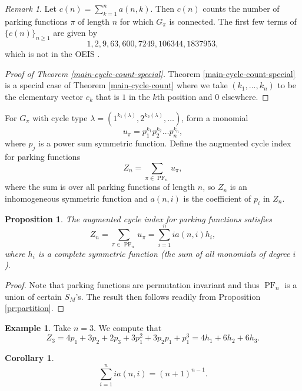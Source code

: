 \documentclass[letterpaper]{amsart}
\theoremstyle{plain}
\newtheorem{proposition}[theorem]{Proposition}
\newtheorem{corollary}[theorem]{Corollary}
\theoremstyle{definition}
\newtheorem{example}[theorem]{Example}
\theoremstyle{remark}
\newtheorem*{remark}{Remark}
\DeclareMathOperator{\PF}{PF}
\begin{document}
\begin{remark}\label{rk:parking}
Let $c(n)=\sum_{k=1}^n a(n, k)$. Then $c(n)$ counts the number of parking functions $\pi$ of length $n$ for which $G_\pi$ is connected. The first few terms of $\{c(n)\}_{n \geq 1}$ are given by
\[1, 2, 9, 63, 600, 7249, 106344, 1837953,\]
which is not in the OEIS \cite{OEIS}.
\end{remark}

\begin{proof}[Proof of Theorem \ref{main-cycle-count-special}]
Theorem \ref{main-cycle-count-special} is a special case of Theorem \ref{main-cycle-count} where we take $(k_1, \dots, k_n)$ to be the elementary vector $e_k$ that is $1$ in the $k$th position and $0$ elsewhere.
\end{proof}

For $G_\pi$ with cycle type $\lambda=(1^{k_1(\lambda)}, 2^{k_2(\lambda)}, \dots)$, form a monomial \[u_\pi=p_1^{k_1} p_2^{k_2} \dots p_n^{k_n},\]
where $p_j$ is a power sum symmetric function. Define the augmented cycle index for parking functions
\begin{equation*}
Z_n=\sum_{\pi \in \PF_n} u_\pi,
\end{equation*}
where the sum is over all parking functions of length $n$, so $Z_n$ is an inhomogeneous symmetric function and $a(n,i)$ is the coefficient of $p_i$ in $Z_n$.

\begin{proposition}\label{pr:parking-augmented}
The augmented cycle index for parking functions satisfies
\[Z_n=\sum_{\pi \in \PF_n} u_\pi=\sum_{i=1}^n i a(n,i) h_i,\]
where $h_i$ is a complete symmetric function (the sum of all monomials of degree $i$).
\end{proposition}

\begin{proof}
Note that parking functions are permutation invariant and thus $\PF_n$ is a union of certain $S_M$'s. The result then follows readily from Proposition \ref{pr:partition}.
\end{proof}

\begin{example}
Take $n=3$. We compute that
\[Z_3=4p_1 + 3p_2 + 2p_3 +3p_1^2 + 3p_2 p_1 + p_1^3=4h_1+6h_2+6h_3.\]
\end{example}

\begin{corollary}
\begin{equation*}
\sum_{i=1}^n i a(n,i) = (n+1)^{n-1}.
\end{equation*}
\end{corollary}
\end{document}
